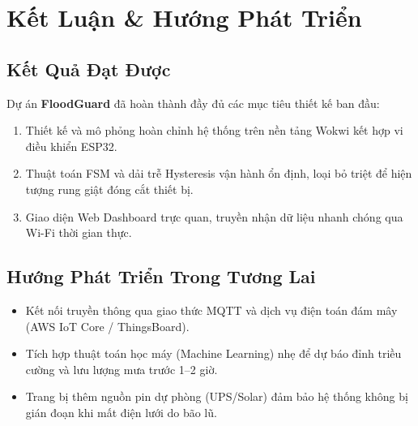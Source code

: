\chapter{Kết Luận \& Hướng Phát Triển}

\section{Kết Quả Đạt Được}
Dự án \textbf{FloodGuard} đã hoàn thành đầy đủ các mục tiêu thiết kế ban đầu:
\begin{enumerate}
    \item Thiết kế và mô phỏng hoàn chỉnh hệ thống trên nền tảng Wokwi kết hợp vi điều khiển ESP32.
    \item Thuật toán FSM và dải trễ Hysteresis vận hành ổn định, loại bỏ triệt để hiện tượng rung giật đóng cắt thiết bị.
    \item Giao diện Web Dashboard trực quan, truyền nhận dữ liệu nhanh chóng qua Wi-Fi thời gian thực.
\end{enumerate}

\section{Hướng Phát Triển Trong Tương Lai}
\begin{itemize}
    \item Kết nối truyền thông qua giao thức MQTT và dịch vụ điện toán đám mây (AWS IoT Core / ThingsBoard).
    \item Tích hợp thuật toán học máy (Machine Learning) nhẹ để dự báo đỉnh triều cường và lưu lượng mưa trước 1--2 giờ.
    \item Trang bị thêm nguồn pin dự phòng (UPS/Solar) đảm bảo hệ thống không bị gián đoạn khi mất điện lưới do bão lũ.
\end{itemize}

